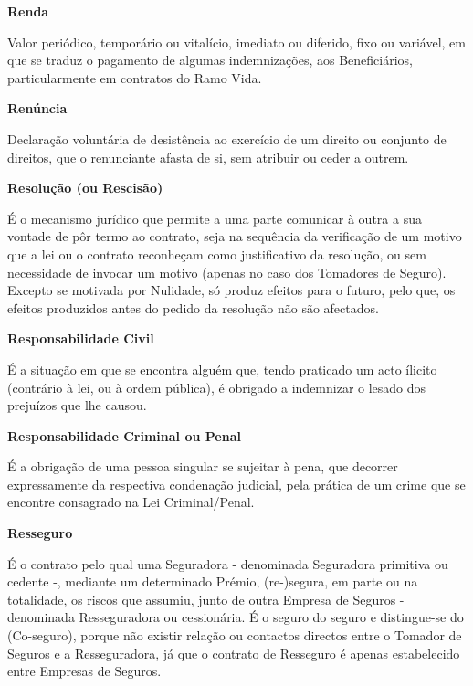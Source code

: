 \begin{description}
\item \textbf{Renda}

Valor periódico, temporário ou vitalício, imediato ou diferido, fixo ou variável, em que se traduz o pagamento de algumas indemnizações, aos Beneficiários, particularmente em contratos do Ramo Vida.
\end{description}

\begin{description}
\item \textbf{Renúncia}

Declaração voluntária de desistência ao exercício de um direito ou conjunto de direitos, que o renunciante afasta de si, sem atribuir ou ceder a outrem.
\end{description}

\begin{description}
\item \textbf{Resolução (ou Rescisão)}

É o mecanismo jurídico que permite a uma parte comunicar à outra a sua vontade de pôr termo ao contrato, seja na sequência da verificação de um motivo que a lei ou o contrato reconheçam como justificativo da resolução, ou sem necessidade de invocar um motivo (apenas no caso dos Tomadores de Seguro). Excepto se motivada por Nulidade, só produz efeitos para o futuro, pelo que, os efeitos produzidos antes do pedido da resolução não são afectados.
\end{description}

\begin{description}
\item \textbf{Responsabilidade Civil}

É a situação em que se encontra alguém  que, tendo praticado um acto ílicito (contrário à lei, ou à ordem pública), é obrigado a indemnizar o lesado dos prejuízos que lhe causou.
\end{description}

\begin{description}
\item \textbf{Responsabilidade Criminal ou Penal}

É a obrigação de uma pessoa singular se sujeitar à pena, que decorrer expressamente da respectiva condenação judicial, pela prática de um crime que se encontre consagrado na Lei Criminal/Penal.
\end{description}

\begin{description}
\item \textbf{Resseguro}

É o contrato pelo qual uma Seguradora - denominada Seguradora primitiva ou cedente -, mediante um determinado Prémio, (re-)segura, em parte ou na totalidade, os riscos que assumiu, junto de outra Empresa de Seguros - denominada Resseguradora ou cessionária. É o seguro do seguro e distingue-se do (Co-seguro), porque não existir relação ou contactos directos entre o Tomador de Seguros e a Resseguradora, já que o contrato de Resseguro é apenas estabelecido entre Empresas de Seguros.
\end{description}

